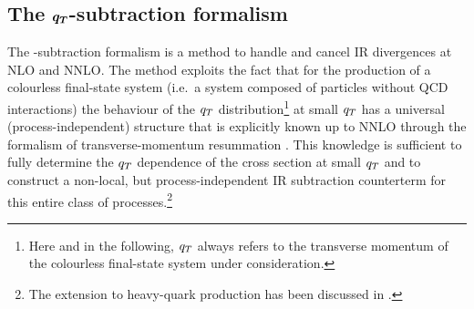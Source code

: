 \documentclass[english,11pt]{article}
\begin{document}
\subsection[The $\qT$-subtraction formalism]{The $\boldsymbol{q_T}$-subtraction formalism}
\label{subsec:formalism}

The \qt{}-subtraction formalism \cite{Catani:2007vq} is a method to handle and cancel IR divergences at NLO and NNLO.
The method exploits the fact that for the production of a colourless final-state system 
(i.e.\ a system composed of particles without QCD interactions) 
the behaviour of the $\qT$
distribution\footnote{Here and in the following, $\qT$ always refers
to the transverse momentum of the colourless final-state system under consideration.} at small $\qT$
has a universal (process-independent) structure that is explicitly known up to NNLO
through the formalism of transverse-momentum resummation \cite{Collins:1984kg,Bozzi:2005wk}.
This knowledge is sufficient to fully determine the $\qT$ dependence of the cross section at small $\qT$ and to
construct a non-local, but process-independent IR subtraction counterterm
 for this entire class of processes.\footnote{The extension to heavy-quark production has been discussed in .}
\end{document}

